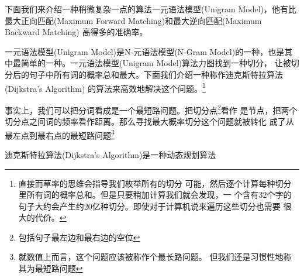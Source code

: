 \documentclass[11pt,a4paper]{article}
\def\maxforward{最大正向匹配(Maximum Forward Matching)}
\def\maxbackward{最大逆向匹配(Maximum Backward Matching)}
\def\NGram{N-元语法模型(N-Gram Model)}
\def\UniGram{一元语法模型(Unigram Model)}
\def\DijkstraAlgorithm{迪克斯特拉算法(Dijkstra's Algorithm)}
\begin{document}
下面我们来介绍一种稍微复杂一点的算法\UniGram，他有比\maxforward 和\maxbackward
高得多的准确率。

\UniGram 是\NGram 的一种，也是其中最简单的一种。\UniGram 算法力图找到一种切分，
让被切分后的句子中所有词的概率总和最大。下面我们介绍一种称作\DijkstraAlgorithm
的算法来高效地解决这个问题。\footnote{直接而草率的思维会指导我们枚举所有的切分
可能，然后逐个计算每种切分里所有词的概率总和。但是只要稍加计算我们就会发现，一
个含有32个字的句子大约会产生约20亿种切分。即使对于计算机说来遍历这些切分也需要
很大的代价。}

事实上，我们可以把分词看成是一个最短路问题。把切分点\footnote{包括句子最左边和最右边的空位}看作
是节点，把两个切分点之间词的频率看作距离。那么寻找最大概率切分这个问题就被转化
成了从最左点到最右点的最短路问题\footnote{就数值上而言，这个问题应该被称作个最长路问题。
但我们还是习惯性地称其为最短路问题} 

\DijkstraAlgorithm 是一种动态规划算法

\begin{algorithm}
	\label{alg_maxforward}
	\dontprintsemicolon

	\caption{\maxforward}
\end{algorithm}
\end{document}
